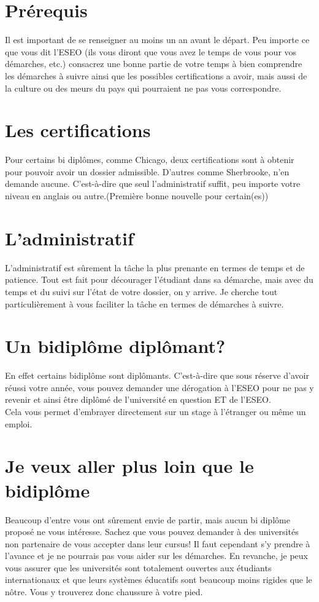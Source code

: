 \section{Prérequis}\label{sec:sec1}

Il est important de se renseigner au moins un an avant le départ. Peu importe ce que vous dit l'ESEO (ils vous diront que vous avez le temps de vous pour vos démarches, etc.) consacrez une bonne partie de votre temps à bien comprendre les démarches à suivre ainsi que les possibles certifications a avoir, mais aussi de la culture ou des meurs du pays qui pourraient ne pas vous correspondre.

\section{Les certifications}\label{sec:sec2}

Pour certains bi diplômes, comme Chicago, deux certifications sont à obtenir pour pouvoir avoir un dossier admissible. D'autres comme Sherbrooke, n'en demande aucune. C'est-à-dire que seul l'administratif suffit, peu importe votre niveau en anglais ou autre.(Première bonne nouvelle pour certain(es))

\section{L'administratif}\label{sec:sec3}

L'administratif est sûrement la tâche la plus prenante en termes de temps et de patience. Tout est fait pour décourager l'étudiant dans sa démarche, mais avec du temps et du suivi sur l'état de votre dossier, on y arrive. Je cherche tout particulièrement à vous faciliter la tâche en termes de démarches à suivre.

\section{Un bidiplôme diplômant?}\label{sec:sec4}

En effet certains bidiplôme sont diplômants. C'est-à-dire que sous réserve d'avoir réussi votre année, vous pouvez demander une dérogation à l'ESEO pour ne pas y revenir et ainsi être diplômé de l'université en question ET de l'ESEO. \\
Cela vous permet d'embrayer directement sur un stage à l'étranger ou même un emploi.

\section{Je veux aller plus loin que le bidiplôme}\label{sec:sec5}

Beaucoup d'entre vous ont sûrement envie de partir, mais aucun bi diplôme proposé ne vous intéresse. Sachez que vous pouvez demander à des universités non partenaire de vous accepter dans leur cursus! Il faut cependant s'y prendre à l'avance et je ne pourrais pas vous aider sur les démarches. En revanche, je peux vous assurer que les universités sont totalement ouvertes aux étudiants internationaux et que leurs systèmes éducatifs sont beaucoup moins rigides que le nôtre. Vous y trouverez donc chaussure à votre pied.
